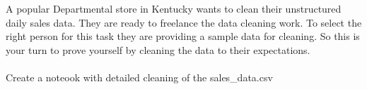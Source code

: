 \documentclass{book}
\begin{document}
	A popular Departmental store in Kentucky wants to clean their unstructured daily sales data. They are ready to freelance the data cleaning work. To select the right person for this task they are providing a sample data for cleaning.  So this is your turn to prove yourself by cleaning the data to their expectations. 
\\\\	
Create a noteook with detailed cleaning of the sales\_data.csv
\end{document}

